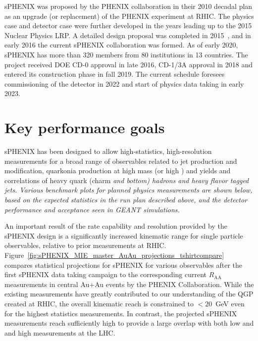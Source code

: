 sPHENIX was proposed by the PHENIX collaboration in their 2010 decadal plan as an upgrade (or replacement) of the PHENIX experiment at RHIC. The physics case and detector case were further developed in the years leading up to the 2015 Nuclear Physics LRP. A detailed design proposal was completed in 2015~\cite{sPHENIX:2015irh}, and in early 2016 the current sPHENIX collaboration was formed. As of early 2020, sPHENIX has more than 320 members from 80 institutions in 13 countries. The project received DOE CD-0 approval in late 2016, CD-1/3A approval in 2018 and entered its
construction phase in fall 2019. The current schedule foresees commissioning of the detector in 2022 and start of physics data taking in early 2023.

\section{Key performance goals}

sPHENIX has been designed to allow high-statistics, high-resolution measurements for a broad
range of observables related to jet production and modification, quarkonia production
at high mass (or high \pt) and yields and correlations of heavy quark (charm \em and \em bottom) hadrons and heavy flavor tagged jets. Various benchmark plots for planned physics
measurements are shown below, based on the expected statistics in the run plan described
above, and the detector performance and acceptance seen in GEANT simulations.

An important result of the rate capability and resolution provided by the sPHENIX design
is a significantly increased kinematic range for single particle observables, relative
to prior measurements at RHIC.
Figure~\ref{fig:sPHENIX_MIE_master_AuAu_projections_tshirtcompare} compares
statistical projections for sPHENIX for various observables after the first sPHENIX data
taking campaign to the corresponding current $R_\mathrm{AA}$ measurements in central
Au$+$Au events by the PHENIX Collaboration.
While the existing measurements have greatly contributed to our
understanding of the QGP created at RHIC, the overall kinematic reach is
constrained to $< 20$~GeV even for the highest statistics
measurements. In contrast, the projected sPHENIX measurements reach sufficiently high \pt to
provide a large overlap with both low and and high \pt measurements at the LHC.

